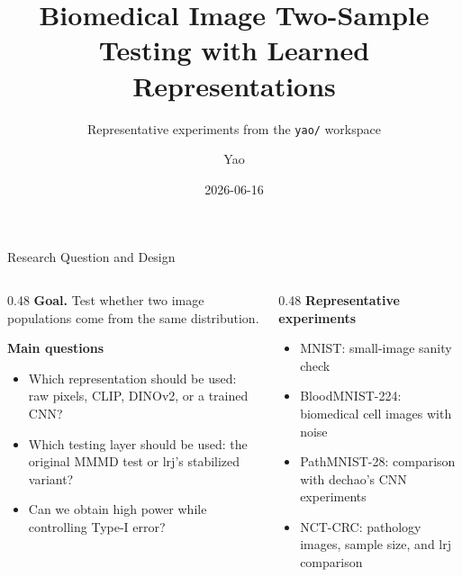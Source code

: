 \documentclass[aspectratio=169,11pt]{beamer}
\title[Image MMMD Testing]{Biomedical Image Two-Sample Testing with Learned Representations}
\subtitle{Representative experiments from the \texttt{yao/} workspace}
\author{Yao}
\institute{Biostatistics Project}
\date{2026-06-16}
\begin{document}
\begin{frame}
  \titlepage
\end{frame}

\begin{frame}{Research Question and Design}
  \begin{columns}[T,onlytextwidth]
    \begin{column}{0.48\textwidth}
      \textbf{Goal.} Test whether two image populations come from the same distribution.
      \vspace{0.5em}

      \textbf{Main questions}
      \begin{itemize}
        \item Which representation should be used: raw pixels, CLIP, DINOv2, or a trained CNN?
        \item Which testing layer should be used: the original MMMD test or lrj's stabilized variant?
        \item Can we obtain high power while controlling Type-I error?
      \end{itemize}
    \end{column}
    \begin{column}{0.48\textwidth}
      \textbf{Representative experiments}
      \begin{itemize}
        \item MNIST: small-image sanity check
        \item BloodMNIST-224: biomedical cell images with noise
        \item PathMNIST-28: comparison with dechao's CNN experiments
        \item NCT-CRC: pathology images, sample size, and lrj comparison
      \end{itemize}
    \end{column}
  \end{columns}
\end{frame}
\end{document}
